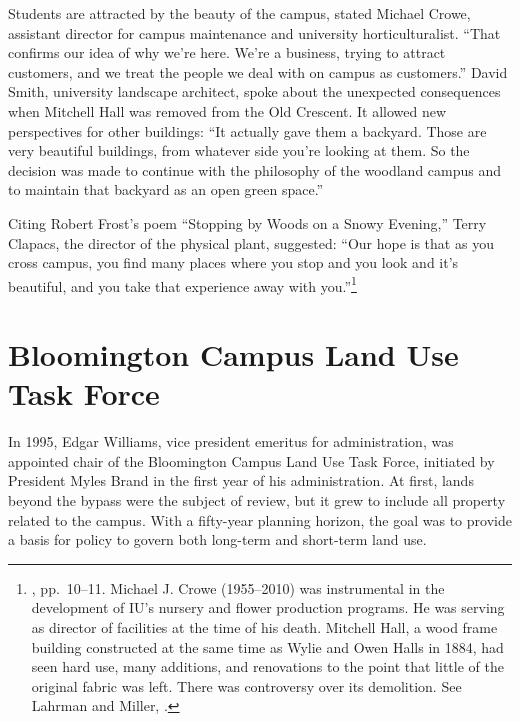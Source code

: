 \documentclass[
  american,
  letterpaper,
]{scrreprt}
\begin{document}
Students are attracted by the beauty of the campus, stated Michael
Crowe, assistant director for campus maintenance and university
horticulturalist. ``That confirms our idea of why we're here. We're a
business, trying to attract customers, and we treat the people we deal
with on campus as customers.'' David Smith, university landscape
architect, spoke about the unexpected consequences when Mitchell Hall
was removed from the Old Crescent. It allowed new perspectives for other
buildings: ``It actually gave them a backyard. Those are very beautiful
buildings, from whatever side you're looking at them. So the decision
was made to continue with the philosophy of the woodland campus and to
maintain that backyard as an open green space.''

Citing Robert Frost's poem ``Stopping by Woods on a Snowy Evening,''
Terry Clapacs, the director of the physical plant, suggested: ``Our hope
is that as you cross campus, you find many places where you stop and you
look and it's beautiful, and you take that experience away with
you.''\footnote{, pp.~10--11. Michael J. Crowe (1955--2010) was
  instrumental in the development of IU's nursery and flower production
  programs. He was serving as director of facilities at the time of his
  death. Mitchell Hall, a wood frame building constructed at the same
  time as Wylie and Owen Halls in 1884, had seen hard use, many
  additions, and renovations to the point that little of the original
  fabric was left. There was controversy over its demolition. See
  Lahrman and Miller, .}

\section{Bloomington Campus Land Use Task
Force}\label{bloomington-campus-land-use-task-force}

In 1995, Edgar Williams, vice president emeritus for administration, was
appointed chair of the Bloomington Campus Land Use Task Force, initiated
by President Myles Brand in the first year of his administration. At
first, lands beyond the bypass were the subject of review, but it grew
to include all property related to the campus. With a fifty-year
planning horizon, the goal was to provide a basis for policy to govern
both long-term and short-term land use.
\end{document}
